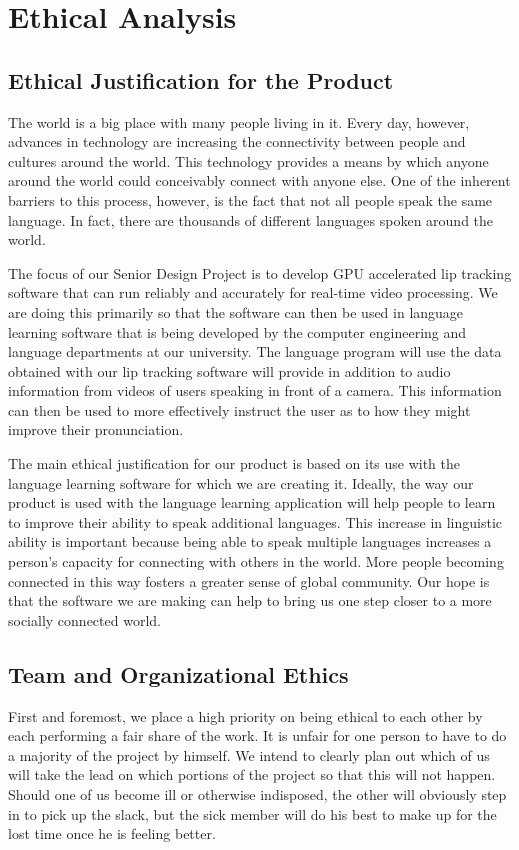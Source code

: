 \chapter{Ethical Analysis}

\section{Ethical Justification for the Product}
The world is a big place with many people living in it. Every day, however, advances in technology are increasing the connectivity between people and cultures around the world. This technology provides a means by which anyone around the world could conceivably connect with anyone else. One of the inherent barriers to this process, however, is the fact that not all people speak the same language. In fact, there are thousands of different languages spoken around the world. 

The focus of our Senior Design Project is to develop GPU accelerated lip tracking software that can run reliably and accurately for real-time video processing. We are doing this primarily so that the software can then be used in language learning software that is being developed by the computer engineering and language departments at our university. The language program will use the data obtained with our lip tracking software will provide in addition to audio information from videos of users speaking in front of a camera. This information can then be used to more effectively instruct the user as to how they might improve their pronunciation.

The main ethical justification for our product is based on its use with the language learning software for which we are creating it. Ideally, the way our product is used with the language learning application will help people to learn to improve their ability to speak additional languages. This increase in linguistic ability is important because being able to speak multiple languages increases a person's capacity for connecting with others in the world. More people becoming connected in this way fosters a greater sense of global community. Our hope is that the software we are making can help to bring us one step closer to a more socially connected world.


\section{Team and Organizational Ethics}
First and foremost, we place a high priority on being ethical to each other by each performing a fair share of the work. It is unfair for one person to have to do a majority of the project by himself. We intend to clearly plan out which of us will take the lead on which portions of the project so that this will not happen. Should one of us become ill or otherwise indisposed, the other will obviously step in to pick up the slack, but the sick member will do his best to make up for the lost time once he is feeling better.

